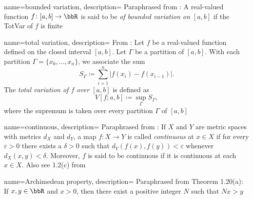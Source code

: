 
%
{%
  name={bounded variation},%
  description={%
    Paraphrased from \cite[Ch.\@ 2\S1, p.\@ 17]{wheeden-zygmund}: A
    real-valued function $f\colon[a,b]\to\bbR$ is said to be \emph{of
      bounded variation on $[a,b]$} if the \gls{TotVar} of $f$ is
    finite%
  }%
}%


%
{%
  name={total variation},%
  description={%
    From \cite[Ch.\@ 2\S1, p.\@ 17]{wheeden-zygmund}: Let $f$ be a
    real-valued function defined on the closed interval $[a,b]$. Let
    $\Gamma$ be a partition of $[a,b]$. With each partition
    $\Gamma=\{x_0,\dotsc,x_n\}$, we associate the sum
    \[
      S_\Gamma\coloneqq\sum_{i=1}^n|f(x_i)-f(x_{i-1})|.
    \]
    The \emph{total variation of $f$ over $[a,b]$} is defined as
    \[
      V[f;a,b]\coloneqq\sup_{\Gamma}S_\Gamma,
    \]
    where the supremum is taken over every partition $\Gamma$ of $[a,b]$%
  }%
}%

%
{%
  name={continuous},%
  description={%
    Paraphrased from \cite[Ch.\@ P\S6, p.\@ 14]{folland}: If $X$ and $Y$
    are metric spaces with metrics $d_X$ and $d_Y$, a map $f\colon X\to Y$
    is called \emph{continuous} at $x\in X$ if for every $\varepsilon>0$
    there exists a $\delta>0$ such that $d_Y(f(x),f(y))<\varepsilon$
    whenever $d_X(x,y)<\delta$. Moreover, $f$ is said to be continuous if
    it is continuous at each $x\in X$. Also see 1.2(c) from \cite[Ch.\@ 1,
    p.\@ 8]{rudin-2}%
  }%
}

%
{%
  name={Archimedean property},%
  description={%
    Paraphrased from \cite[Ch.\@ 1, p.\@ 9]{rudin-1} Theorem 1.20(a): If
    $x,y\in\bbR$ and $x>0$, then there exist a positive integer $N$ such
    that $Nx>y$%
  }%
}

